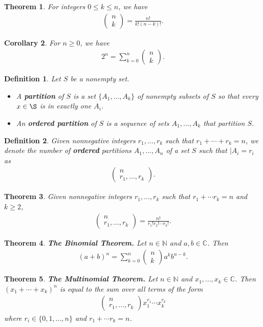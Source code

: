 \documentclass{article}
\theoremstyle{sltheorem}
\newtheorem{definition}{Definition}[section]
\newtheorem{theorem}{Theorem}[section]
\newtheorem{corollary}[theorem]{Corollary}
\newcommand{\N}{\mathbb{N}}
\newcommand{\C}{\mathbb{C}}
\newcommand*\binco[2]{\begin{pmatrix}
    #1\\#2
\end{pmatrix}}
\begin{document}
\begin{theorem}
    For integers $0\leq k \leq n$, we have
    \begin{align*}
        \binco{n}{k}=\frac{n!}{k!(n-k)!}.
    \end{align*}
\end{theorem}
\begin{corollary}
    For $n\geq 0$, we have
    \begin{align*}
        2^n = \sum_{k=0}^n \binco{n}{k}.
    \end{align*}
\end{corollary}
\begin{definition}
    Let $S$ be a nonempty set.
    \begin{itemize}
        \item A \textbf{partition} of $S$ is a set $\{A_1,...,A_k\}$ of nonempty subsets of $S$ so that every $x\in\S$ is in exactly one $A_i$.
        \item An \textbf{ordered partition} of $S$ is a sequence of sets $A_1,...,A_k$ that partition $S$.
    \end{itemize}
\end{definition}
\begin{definition}
    Given nonnegative integers $r_1, ..., r_k$ such that $r_1+\cdots + r_k=n$, we denote the number of \textbf{ordered} partitions $A_1,..., A_n$ of a set $S$ such that $|A_i=r_i$ as
    \begin{align*}
        \binco{n}{r_1,...,r_k}.
    \end{align*}
\end{definition}
\begin{theorem}
    Given nonnegative integers $r_1, ..., r_k$ such that $r_1+\cdots r_k=n$ and $k\geq 2$, 
    \begin{align*}
        \binco{n}{r_1, ..., r_k}=\frac{n!}{r_1!r_2!\cdots r_k!}.
    \end{align*}
\end{theorem}
\begin{theorem}
    \textbf{The Binomial Theorem.} Let $n\in\N$ and $a,b\in\C$. Then
    \begin{align*}
        (a+b)^n=\sum_{k=0}^n \binco{n}{k}a^kb^{n-k}.
    \end{align*}
\end{theorem}
\begin{theorem}
    \textbf{The Multinomial Theorem.} Let $n\in\N$ and $x_1, ..., x_k\in\C$. Then $(x_1+\cdots+x_k)^n$ is equal to the sum over all terms of the form
    \begin{align*}
        \binco{n}{r_1,...,r_k}x_1^{r_1}\cdots x_k^{r_k}
    \end{align*}
    where $r_i\in\{0,1,...,n\}$ and $r_1+\cdots r_k=n$.
\end{theorem}
\end{document}
